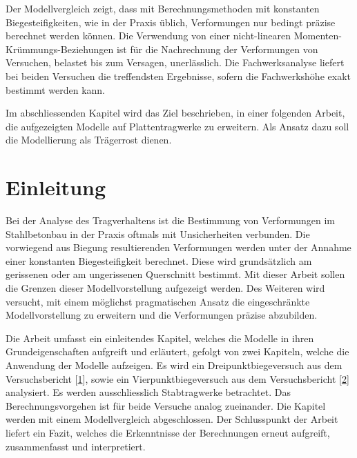 \documentclass[
  12pt,
  letterpaper,
  egregdoesnotlikesansseriftitles]{scrreprt}
\renewcommand*\contentsname{Inhaltsverzeichnis}
\newcommand\contentsname{Inhaltsverzeichnis}
\begin{document}
Der Modellvergleich zeigt, dass mit Berechnungsmethoden mit konstanten Biegesteifigkeiten, wie in der Praxis üblich, Verformungen nur bedingt präzise berechnet werden können. Die Verwendung von einer nicht-linearen Momenten-Krümmungs-Beziehungen ist für die Nachrechnung der Verformungen von Versuchen, belastet bis zum Versagen, unerlässlich. Die Fachwerksanalyse liefert bei beiden Versuchen die treffendsten Ergebnisse, sofern die Fachwerkshöhe exakt bestimmt werden kann. 


Im abschliessenden Kapitel wird das Ziel beschrieben, in einer folgenden Arbeit, die aufgezeigten Modelle auf Plattentragwerke zu erweitern. Als Ansatz dazu soll die Modellierung als Trägerrost dienen.

\ifdefined\Shaded\renewenvironment{Shaded}{\begin{tcolorbox}[enhanced, interior hidden, sharp corners, boxrule=0pt, borderline west={3pt}{0pt}{shadecolor}, breakable, frame hidden]}{\end{tcolorbox}}\fi

\renewcommand*\contentsname{Inhaltsverzeichnis}
{
\hypersetup{linkcolor=}
\setcounter{tocdepth}{1}
\tableofcontents
}
\listoffigures
\listoftables
{}

\hypertarget{einleitung}{%
\chapter{Einleitung}\label{einleitung}}

Bei der Analyse des Tragverhaltens ist die Bestimmung von Verformungen
im Stahlbetonbau in der Praxis oftmals mit Unsicherheiten verbunden. Die
vorwiegend aus Biegung resultierenden Verformungen werden unter der
Annahme einer konstanten Biegesteifigkeit berechnet. Diese wird
grundsätzlich am gerissenen oder am ungerissenen Querschnitt bestimmt.
Mit dieser Arbeit sollen die Grenzen dieser Modellvorstellung aufgezeigt
werden. Des Weiteren wird versucht, mit einem möglichst pragmatischen
Ansatz die eingeschränkte Modellvorstellung zu erweitern und die
Verformungen präzise abzubilden.

Die Arbeit umfasst ein einleitendes Kapitel, welches die Modelle in
ihren Grundeigenschaften aufgreift und erläutert, gefolgt von zwei
Kapiteln, welche die Anwendung der Modelle aufzeigen. Es wird ein
Dreipunktbiegeversuch aus dem Versuchsbericht
{[}\protect\hyperlink{ref-Jaeger2006}{1}{]}, sowie ein
Vierpunktbiegeversuch aus dem Versuchsbericht
{[}\protect\hyperlink{ref-Tue2019}{2}{]} analysiert. Es werden
ausschliesslich Stabtragwerke betrachtet. Das Berechnungsvorgehen ist
für beide Versuche analog zueinander. Die Kapitel werden mit einem
Modellvergleich abgeschlossen. Der Schlusspunkt der Arbeit liefert ein
Fazit, welches die Erkenntnisse der Berechnungen erneut aufgreift,
zusammenfasst und interpretiert.
\end{document}
